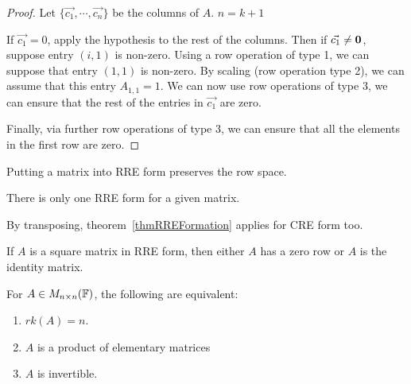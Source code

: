 \documentclass[../Main.tex]{subfiles}
\begin{document}
\begin{proof}
    Let $\{\vec{c_1}, \cdots, \vec{c_n}\}$ be the columns of $A$.
    {$n = k+1$}{
        If $\vec{c_1} = 0$, apply the hypothesis to the rest of the columns. Then if $\vec{c_1} \neq \boldsymbol{0}$, suppose entry $(i, 1)$ is non-zero. Using a row operation of type 1, we can suppose that entry $(1, 1)$ is non-zero. By scaling (row operation type 2), we can assume that this entry $A_{1, 1} = 1$.
        We can now use row operations of type 3, we can ensure that the rest of the entries in $\vec{c_1}$ are zero.
        
        Finally, via further row operations of type 3, we can ensure that all the elements in the first row are zero.
    }
\end{proof}
\begin{remarks}
    \item Putting a matrix into RRE form preserves the row space.
    \item There is only one RRE form for a given matrix.
    \item By transposing, theorem~\ref{thmRREFormation} applies for CRE form too.
    \item If $A$ is a square matrix in RRE form, then either $A$ has a zero row or $A$ is the identity matrix.
\end{remarks}
\begin{theorem}
    For $A \in M_{n \times n}(\mathbb{F})$, the following are equivalent:
    \begin{enumerate}
        \item $rk(A) = n$.
        \item $A$ is a product of elementary matrices
        \item $A$ is invertible.
    \end{enumerate}
    \label{thmInvertibilityCriterion}
\end{theorem}
\end{document}
